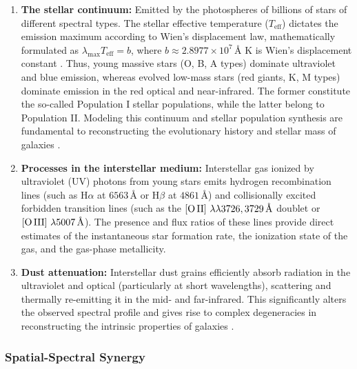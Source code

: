 \begin{enumerate}
\item \textbf{The stellar continuum:} Emitted by the photospheres of billions of stars of different spectral types. The stellar effective temperature ($T_{\text{eff}}$) dictates the emission maximum according to Wien's displacement law, mathematically formulated as $\lambda_{\text{max}} T_{\text{eff}} = b$, where $b \approx 2.8977 \times 10^7\,\text{\AA{} K}$ is Wien's displacement constant \autocite{ar:wien-1894}. Thus, young massive stars (O, B, A types) dominate ultraviolet and blue emission, whereas evolved low-mass stars (red giants, K, M types) dominate emission in the red optical and near-infrared. The former constitute the so-called Population I stellar populations, while the latter belong to Population II. Modeling this continuum and stellar population synthesis are fundamental to reconstructing the evolutionary history and stellar mass of galaxies \autocites{ar:bruzual-charlot}{ar:conroy-2013}.

\item \textbf{Processes in the interstellar medium:} Interstellar gas ionized by ultraviolet (UV) photons from young stars emits hydrogen recombination lines (such as $\text{H}\alpha$ at $6563\,\text{\AA{}}$ or $\text{H}\beta$ at $4861\,\text{\AA{}}$) and collisionally excited forbidden transition lines (such as the $\left[\text{O\,II}\right]\,\lambda\lambda 3726, 3729\,\text{\AA{}}$ doublet or $\left[\text{O\,III}\right]\,\lambda 5007\,\text{\AA{}}$). The presence and flux ratios of these lines provide direct estimates of the instantaneous star formation rate, the ionization state of the gas, and the gas-phase metallicity.

\item \textbf{Dust attenuation:} Interstellar dust grains efficiently absorb radiation in the ultraviolet and optical (particularly at short wavelengths), scattering and thermally re-emitting it in the mid- and far-infrared. This significantly alters the observed spectral profile and gives rise to complex degeneracies in reconstructing the intrinsic properties of galaxies \autocites{ar:cardelli-1989}{ar:calzetti-2000}.
\end{enumerate}

\subsubsection{Spatial-Spectral Synergy}


